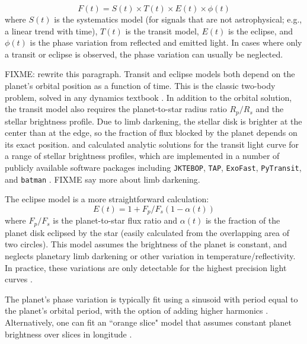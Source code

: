 \documentclass[graybox,natbib,nosecnum]{svmult}
\begin{document}
\begin{equation}
F(t) = S(t) \times T(t) \times E(t) \times \phi(t)
\end{equation}
where $S(t)$ is the systematics model (for signals that are not astrophysical; e.g., a linear trend with time), $T(t)$ is the transit model, $E(t)$ is the eclipse, and $\phi(t)$ is the phase variation from reflected and emitted light. In cases where only a transit or eclipse is observed, the phase variation can usually be neglected.

FIXME: rewrite this paragraph. Transit and eclipse models both depend on the planet's orbital position as a function of time. This is the classic two-body problem, solved in any dynamics textbook \citep[e.g.][]{murray99}. In addition to the orbital solution, the transit model also requires the planet-to-star radius ratio $R_p/R_s$ and the stellar brightness profile. Due to limb darkening, the stellar disk is brighter at the center than at the edge, so the fraction of flux blocked by the planet depends on its exact position.  \cite{mandel02} and \cite{gimenez06} calculated analytic solutions for the transit light curve for a range of stellar brightness profiles,  which are implemented in a number of publicly available software packages including \texttt{JKTEBOP}, \texttt{TAP}, \texttt{ExoFast}, \texttt{PyTransit}, and \texttt{batman} \citep{southworth04, gazak12, eastman13, parviainen15, kreidberg15a}.  FIXME say more about limb darkening.

The eclipse model is a more straightforward calculation: 
\begin{equation}
E(t) = 1 + F_p/F_s (1 - \alpha(t)) 
\end{equation}
where $F_p/F_s$ is the planet-to-star flux ratio and $\alpha(t)$ is the fraction of the planet disk eclipsed by the star (easily calculated from the overlapping area of two circles). This model assumes the brightness of the planet is constant, and neglects planetary limb darkening or other variation in temperature/reflectivity. In practice, these variations are only detectable for the highest precision light curves \citep{FIXME}. 

The planet's phase variation is typically fit using a sinusoid with period equal to the planet's orbital period, with the option of adding higher harmonics \citep[e.g.][]{knutson12, stevenson16}. Alternatively, one can fit an ``orange slice" model that assumes constant planet brightness over slices in longitude \citep{knutson07, cowan08}. 
\end{document}
